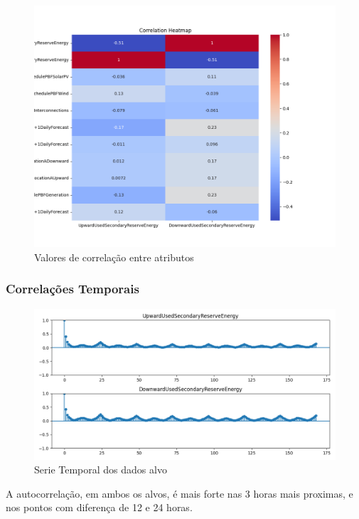 \begin{figure}[H]
  \centering
  \includegraphics[width=\textwidth]{../plots/correlation_heatmap.png}
  \caption{Valores de correlação entre atributos}
\end{figure}

\subsubsection{Correlações Temporais}

\begin{figure}[H]
  \centering
  \includegraphics[width=\textwidth]{../plots/autocorrelation.png}
  \caption{Serie Temporal dos dados alvo}
\end{figure}


A autocorrelação, em ambos os alvos, é mais forte nas 3 horas mais proximas, e nos pontos com diferença de 12 e 24 horas.

